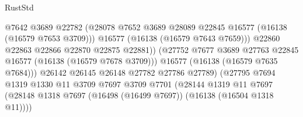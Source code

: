 \begin{lexlean}{RustStd}
\begin{coremodule}
                                              @7642
                                              @3689
                                              @22782
                                              (@28078
                                                @7652
                                                @3689
                                                @28089
                                                @22845
                                                @16577
                                                (@16138 (@16579 @7653 @3709)))
                                              @16577
                                              (@16138 (@16579 @7643 @7659)))
                                            @22860
                                            @22863
                                            @22866
                                            @22870
                                            @22875
                                            @22881))
                                        (@27752
                                          @7677
                                          @3689
                                          @27763
                                          @22845
                                          @16577
                                          (@16138 (@16579 @7678 @3709)))
                                        @16577
                                        (@16138 (@16579 @7635 @7684)))
                                      @26142
                                      @26145
                                      @26148
                                      @27782
                                      @27786
                                      @27789)
                                    (@27795
                                      @7694
                                      @1319
                                      @1330
                                      @11
                                      @3709
                                      @7697
                                      @3709
                                      @7701
                                      (@28144
                                        @1319
                                        @11
                                        @7697
                                        (@28148
                                          @1318
                                          @7697
                                          (@16498 (@16499 @7697))
                                          (@16138 (@16504 @1318 @11))))

\end{coremodule}
\end{lexlean}
